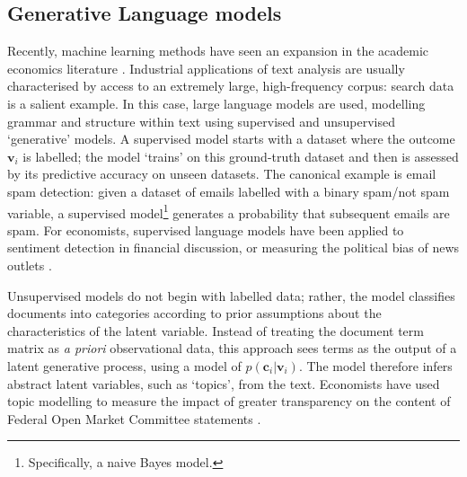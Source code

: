 \documentclass{article}
\begin{document}
\subsection{Generative Language models}
Recently, machine learning methods have seen an expansion in the academic economics literature \parencite{atheyMachineLearningMethods2019a}. Industrial applications of text analysis are usually characterised by access to an extremely large, high-frequency corpus: search data is a salient example. In this case, large language models are used, modelling grammar and structure within text using supervised and unsupervised `generative' models. A supervised model starts with a dataset where the outcome \(\mathbf{v}_i\) is labelled; the model `trains' on this ground-truth dataset and then is assessed by its predictive accuracy on unseen datasets. The canonical example is email spam detection: given a dataset of emails labelled with a binary spam/not spam variable, a supervised model\footnote{Specifically, a naive Bayes model.} generates a probability that subsequent emails are spam. For economists, supervised language models have been applied to sentiment detection in financial discussion, or measuring the political bias of news outlets \parencite{grosecloseMeasureMediaBias2005}.

Unsupervised models do not begin with labelled data; rather, the model classifies documents into categories according to prior assumptions about the characteristics of the latent variable. Instead of treating the document term matrix as \textit{a priori} observational data, this approach sees terms as the output of a latent generative process, using a model of \(p(\mathbf{c}_i|\mathbf{v}_i)\). The model therefore infers abstract latent variables, such as `topics', from the text. Economists have used topic modelling to measure the impact of greater transparency on the content of Federal Open Market Committee statements \parencite{hansenTransparencyDeliberationFOMC2018}.

\end{document}
